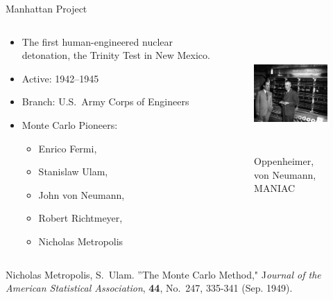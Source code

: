 \documentclass[xcolor=x11names,compress,handout]{beamer}
\renewcommand{\(}{\begin{columns}}
\renewcommand{\)}{\end{columns}}
\newcommand{\<}[1]{\begin{column}{#1}}
\renewcommand{\>}{\end{column}}
\begin{document}
\begin{frame}{Manhattan Project}

\begin{columns}
  \begin{column}{0.5\textwidth}
    \begin{itemize}
    \item The first human-engineered nuclear detonation, 
    the Trinity Test in New Mexico.
    \item Active: 1942--1945
    \item Branch: U.S.\ Army Corps of Engineers
    \item Monte Carlo Pioneers:
    \begin{itemize}
      \item Enrico Fermi,
      \item Stanislaw Ulam,
      \item John von Neumann, 
      \item Robert Richtmeyer, 
      \item Nicholas Metropolis
    \end{itemize}
    \end{itemize}
  \end{column}
  \begin{column}{0.5\textwidth}
  	\begin{figure}
  	\begin{center}
  		\includegraphics[height=1.75in,clip]{fig/OppieNeumannMANIAC}
  		\caption{Oppenheimer, von Neumann, MANIAC}
	\end{center}
  	\end{figure}
  \end{column}
\end{columns}
\vspace{1em}
Nicholas Metropolis, S.\ Ulam. ''The Monte Carlo Method," J\textit{ournal of the American Statistical Association}, \textbf{44}, No.\ 247, 335-341 (Sep. 1949).
\end{frame}
\end{document}
